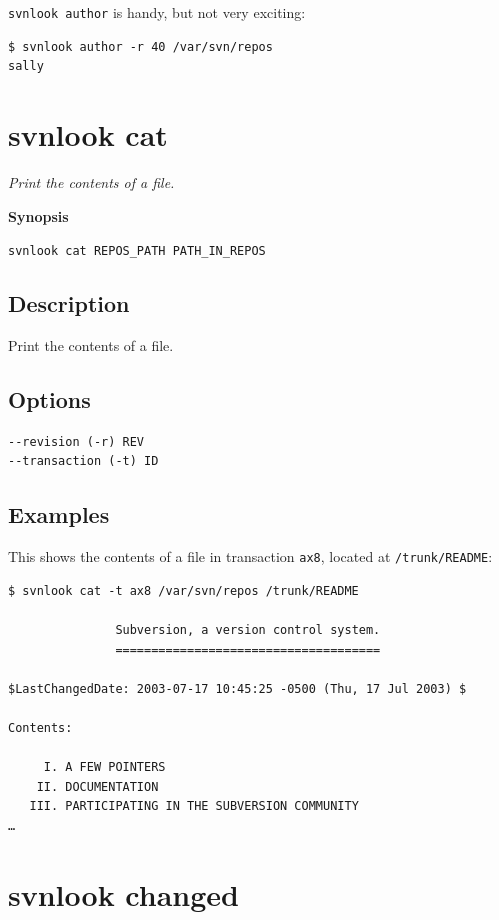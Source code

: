 \texttt{svnlook\ author} is handy, but not very exciting:

\begin{verbatim}
$ svnlook author -r 40 /var/svn/repos 
sally
\end{verbatim}

\section{svnlook cat}\label{svn.ref.svnlook.c.cat}

\emph{Print the contents of a file.}

\textbf{Synopsis}

\texttt{svnlook\ cat\ REPOS\_PATH\ PATH\_IN\_REPOS}

\subsection{Description}

Print the contents of a file.

\subsection{Options}

\begin{verbatim}
--revision (-r) REV
--transaction (-t) ID
\end{verbatim}

\subsection{Examples}

This shows the contents of a file in transaction \texttt{ax8}, located
at \texttt{/trunk/README}:

\begin{verbatim}
$ svnlook cat -t ax8 /var/svn/repos /trunk/README

               Subversion, a version control system.
               =====================================

$LastChangedDate: 2003-07-17 10:45:25 -0500 (Thu, 17 Jul 2003) $

Contents:

     I. A FEW POINTERS
    II. DOCUMENTATION
   III. PARTICIPATING IN THE SUBVERSION COMMUNITY
…
\end{verbatim}

\section{svnlook changed}\label{svn.ref.svnlook.c.changed}

